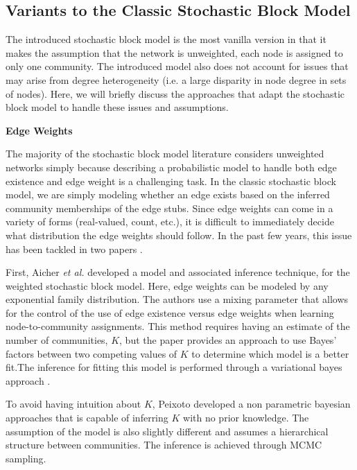 \subsection{Variants to the Classic Stochastic Block Model}

The introduced stochastic block model is the most vanilla version in that it makes the assumption that the network is unweighted, each node is assigned to only one community. The introduced model also does not account for issues that may arise from degree heterogeneity (i.e. a large disparity in node degree in sets of nodes).  Here, we will briefly discuss the approaches that adapt the stochastic block model to handle these issues and assumptions. 

{\bf Edge Weights}

\indent The majority of the stochastic block model literature considers unweighted networks simply because describing a probabilistic model to handle both edge existence and edge weight is a challenging task. In the classic stochastic block model, we are simply modeling whether an edge exists based on the inferred community memberships of the edge stubs. Since edge weights can come in a variety of forms (real-valued, count, etc.), it is difficult to immediately decide what distribution the edge weights should follow. In the past few years, this issue has been tackled in two papers \cite{aicher,peix}.

\indent First, Aicher \emph{et al.} developed a model and associated inference technique, for the weighted stochastic block model. Here, edge weights can be modeled by any exponential family distribution. The authors use a mixing parameter that allows for the control of the use of edge existence versus edge weights when learning node-to-community assignments. This method requires having an estimate of the number of communities, $K$, but the paper provides an approach to use Bayes' factors between two competing values of $K$ to determine which model is a better fit.The inference for fitting this model is performed through a variational bayes approach \cite{vBayes}.

\indent To avoid having intuition about $K$, Peixoto \cite{peix} developed a non parametric bayesian approaches that is capable of inferring $K$ with no prior knowledge. The assumption of the model is also slightly different and assumes a hierarchical structure between communities. The inference is achieved through MCMC sampling. 

